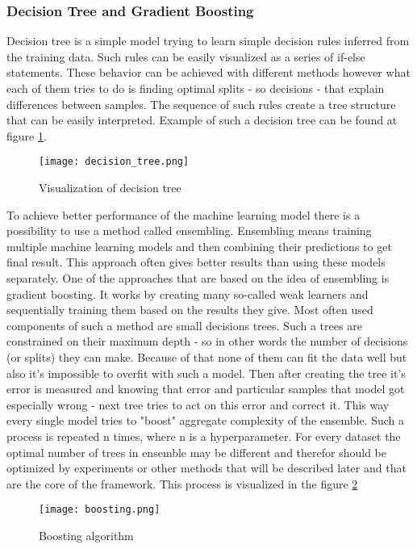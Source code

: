 \documentclass[a4paper,twoside,12pt]{book}
\newcommand*\setcaptioncitation[1]{\def\captioncitation{\textit{Source:}~#1}}
\let\captioncitation\relax
\begin{document}
\subsubsection{Decision Tree and Gradient Boosting}

Decision tree is a simple model trying to learn simple decision rules inferred from the training data. Such rules can be easily visualized as a series of if-else statements. These behavior can be achieved with different methods however what each of them tries to do is finding optimal splits - so decisions - that explain differences between samples. The sequence of such rules create a tree structure that can be easily interpreted. Example of such a decision tree can be found at figure \ref{fig:tree}.

\begin{figure}[ht]
  \centering
  \texttt{[image: decision\_tree.png]}
  \setcaptioncitation{\url{https://cutt.ly/hh7jmin}}
  \caption{Visualization of decision tree}
  \label{fig:tree}
\end{figure}


To achieve better performance of the machine learning model there is a possibility to use a method called ensembling. Ensembling means training multiple machine learning models and then combining their predictions to get final result. This approach often gives better results than using these models separately. 
One of the approaches that are based on the idea of ensembling is gradient boosting.
It works by creating many so-called weak learners and sequentially training them based on the results they give. Most often used components of such a method are small decisions trees. Such a trees are constrained on their maximum depth - so in other words the number of decisions (or splits) they can make. 
Because of that none of them can fit the data well but also it's impossible to overfit with such a model.
Then after creating the tree it's error is measured and knowing that error and particular samples that model got especially wrong - next tree tries to act on this error and correct it. This way every single model tries to "boost" aggregate complexity of the ensemble. Such a process is repeated n times, where n is a hyperparameter. For every dataset the optimal number of trees in ensemble may be different and therefor should be optimized by experiments or other methods that will be described later and that are the core of the framework. This process is visualized in the figure \ref{fig:boosting}  

\begin{figure}[ht]
    \centering
    \texttt{[image: boosting.png]}
    \setcaptioncitation{\url{https://cutt.ly/ijfUC4m}}
    \caption{Boosting algorithm}
    \label{fig:boosting}
\end{figure}
\end{document}
